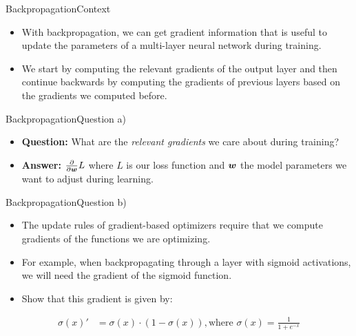 \documentclass[t]{beamer}
\begin{document}
\begin{frame}{Backpropagation}{Context}
    \begin{itemize}
        \item With backpropagation, we can get gradient information that is
              useful to update the parameters of a multi-layer neural network
              during training.
        \item We start by computing the relevant gradients of the output layer
              and then continue backwards by computing the gradients of previous
              layers based on the gradients we computed before.
    \end{itemize}
\end{frame}

\begin{frame}{Backpropagation}{Question a)}
    \begin{itemize}
        \item {\textbf{Question:}} What are the \emph{relevant gradients} we
              care about during training?
              \pause
        \item \textbf{Answer:} $\frac{\partial}{\partial{\boldsymbol{w}}}L$ where $L$ is our
              loss function and ${\boldsymbol{w}}$ the model parameters we want to adjust
              during learning.
    \end{itemize}
\end{frame}

\begin{frame}{Backpropagation}{Question b)}
    \begin{itemize}
        \item The update rules of gradient-based optimizers require that we
              compute gradients of the functions we are optimizing.
        \item For example,
              when backpropagating through a layer with sigmoid activations, we
              will need the gradient of the sigmoid function.
        \item Show that this gradient is given by:
    \end{itemize}
    \begin{align*}
        \sigma(x)' & = \sigma(x) \cdot (1 - \sigma(x)), \text{where } \sigma(x) = \frac{1}{1 + e^{-x}}
    \end{align*}
\end{frame}
\end{document}

